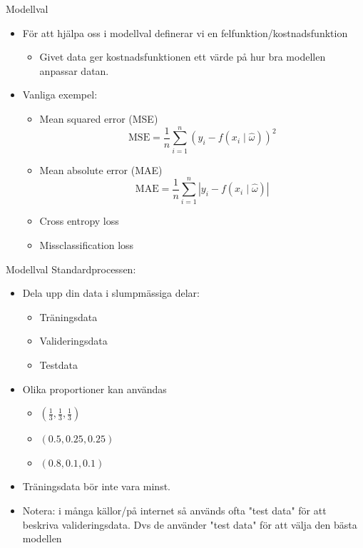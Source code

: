 \documentclass[10pt,english]{beamer}
\begin{document}
\begin{frame}{Modellval}
    \begin{itemize}
        \item För att hjälpa oss i modellval definerar vi en felfunktion/kostnadsfunktion
        \begin{itemize}
            \item Givet data ger kostnadsfunktionen ett värde på hur bra modellen anpassar datan.
        \end{itemize}
        \item Vanliga exempel:
        \begin{itemize}
            \item Mean squared error (MSE)
            \begin{equation*}
                \text{MSE} = \frac{1}{n} \sum_{i=1}^{n} \left(y_i - f(x_i \mid \hat{\omega})\right)^2
            \end{equation*}
            \item Mean absolute error (MAE)
            \begin{equation*}
                \text{MAE} = \frac{1}{n} \sum_{i=1}^{n} \left| y_i - f(x_i \mid \hat{\omega}) \right|
            \end{equation*}
            \item Cross entropy loss
            \item Missclassification loss
        \end{itemize}
    \end{itemize}
\end{frame}

\begin{frame}{Modellval}
    Standardprocessen:
    \begin{itemize}
        \item Dela upp din data i slumpmässiga delar:
        \begin{itemize}
            \item Träningsdata
            \item Valideringsdata
            \item Testdata
        \end{itemize}
        \item Olika proportioner kan användas
        \begin{itemize}
            \item $(\tfrac{1}{3}, \tfrac{1}{3}, \tfrac{1}{3})$
            \item $(0.5, 0.25, 0.25)$
            \item $(0.8, 0.1, 0.1)$
        \end{itemize}
        \item Träningsdata bör inte vara minst.
        \item Notera: i många källor/på internet så används ofta "test data" för att beskriva valideringsdata. Dvs de använder "test data" för att välja den bästa modellen
    \end{itemize}
\end{frame}
\end{document}
